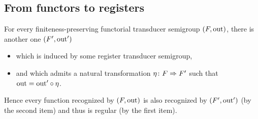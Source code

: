 \documentclass[a4paper,english,cleveref, autoref, thm-restate, numberwithinsect]{lipics-v2021}
\begin{document}
\subsection{From functors to registers}

\begin{theorem}
  For every finiteness-preserving functorial transducer semigroup $(\functor, \outfun)$, there is another one $(\functor',\outfun')$
  \begin{itemize}
    \item which is induced by some register transducer semigroup,
    \item and which admits a natural transformation $\eta \colon \functor \Rightarrow \functor'$ such that $\mathrm{out} = \mathrm{out}' \circ \eta$.
  \end{itemize}
  Hence every function recognized by $(\functor,\outfun)$ is also recognized by $(\functor',\outfun')$ (by the second item) and thus is regular (by the first item).
\end{theorem}
\end{document}
